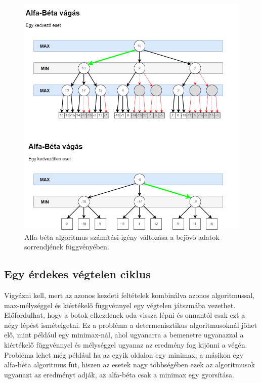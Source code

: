 \documentclass[twoside, a4paper, 12pt]{article}
\begin{document}
\begin{figure}[htbp]
	\centering
	\includegraphics[width=\textwidth]{img/alphabeta_examples.png}
	\caption{Alfa-béta algoritmus számítási-igény változása a bejövő adatok sorrendjének függvényében.}
	\label{fig:alphabeta_examples}
\end{figure}

\subsection{Egy érdekes végtelen ciklus}
Vigyázni kell, mert az azonos kezdeti feltételek kombinálva azonos algoritmussal, max-mélységgel és kiértékelő függvénnyel egy végtelen játszmába vezethet. Előfordulhat, hogy a botok elkezdenek oda-vissza lépni és onnantól csak ezt a négy lépést ismételgetni. Ez a probléma a determenisztikus algoritmusoknál jöhet elő, mint például egy minimax-nál, ahol ugyanarra a bemenetre ugyanazzal a kiértékelő függvénnyel és mélységgel ugyanaz az eredmény fog kijönni a végén. Probléma lehet még például ha az egyik oldalon egy minimax, a másikon egy alfa-béta algoritmus fut, hiszen az esetek nagy többségében ezek az algoritmusok ugyanazt az eredményt adják, az alfa-béta csak a minimax egy gyorsítása.
\end{document}
